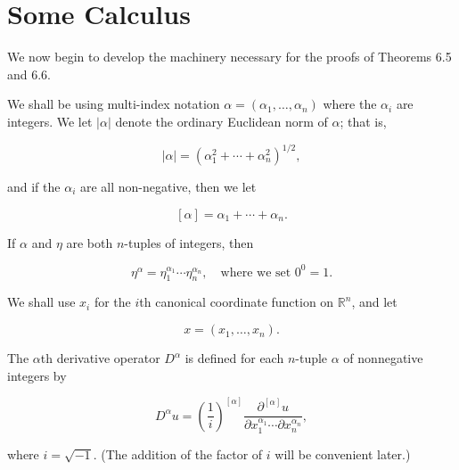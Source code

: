 \section{Some Calculus}


We now begin to develop the machinery necessary for the proofs of Theorems 6.5 and 6.6.

\label{thm:6.15} We shall be using multi-index notation  $ \alpha = (\alpha_1, \ldots, \alpha_n) $ where the  $ \alpha_i $ are integers. We let  $ |\alpha| $ denote the ordinary Euclidean norm of  $ \alpha $; that is,

\begin{equation}
\tag{1}\label{eq:6.15:1}
|\alpha|=(\alpha_{1}^{2}+\cdots+\alpha_{n}^{2})^{1/2},
\end{equation}

and if the  $ \alpha_{i} $ are all non-negative, then we let 

\begin{equation}
\tag{2}\label{eq:6.15:2}
[\alpha]=\alpha_{1}+\cdots+\alpha_{n}.
\end{equation}

If  $ \alpha $ and  $ \eta $ are both  $ n $-tuples of integers, then

\begin{equation}
\tag{3}\label{eq:6.15:3}
\eta^{\alpha}=\eta_{1}^{\alpha_{1}}\cdots\eta_{n}^{\alpha_{n}},\quad\text{where we set }0^{0}=1.
\end{equation}

We shall use $x_{i}$ for the $i$th canonical coordinate function on $\mathbb{R}^{n}$, and let

\begin{equation}
\tag{4}\label{eq:6.15:4}
x=(x_{1},\ldots,x_{n}).
\end{equation}

The $\alpha$th derivative operator $D^{\alpha}$ is defined for each $n$-tuple $\alpha$ of nonnegative integers by

\begin{equation}
\tag{5}\label{eq:6.15:5}
D^{\alpha}u=\left(\frac{1}{i}\right)^{[\alpha]}\frac{\partial^{[\alpha]}u}{\partial x_{1}^{\alpha_{1}}\cdots\partial x_{n}^{\alpha_{n}}},
\end{equation}

where  $ i = \sqrt{-1} $. (The addition of the factor of $i$ will be convenient later.)

